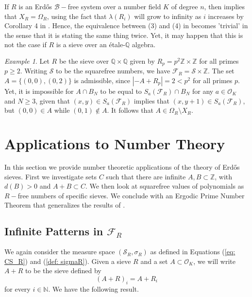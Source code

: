 \documentclass[a4paper,11pt,reqno]{amsart}
\theoremstyle{plain}
\theoremstyle{remark}
\newtheorem{example}[theorem]{Example}
\newcommand{\q}{\mathbb{Q}}
\newcommand{\z}{\mathbb{Z}}
\newcommand{\cb}{\mathcal{B}}
\newcommand{\co}{\mathcal{O}}
\newcommand{\cs}{\mathcal{S}}
\newcommand{\fr}{\mathcal{F}_R}
\begin{document}
			If $R$ is an Erdős $\cb-$free system over a number field $K$ of degree $n$, then   implies that $X_R = \Omega_R$, using the fact that $\lambda(R_i)$ will grow to infinity as $i$ increases by Corollary 4 in \cite{Fraczyk}. Hence, the equivalence between (3) and (4) in  becomes 'trivial' in the sense that it is stating the same thing twice. Yet, it may happen that this is not the case if $R$ is a sieve over an étale-$\q$ algebra.
			
			\begin{example}
				Let $R$ be the sieve over $\q\times \q$ given by $R_p = p^2\z \times \z$ for all primes $p \geq 2$. Writing $\cs$ to be the squarefree numbers, we have $\fr = \cs\times \z$. The set $A = \{(0,0),(0,2)\}$ is admissible, since $|-A+R_p| = 2 < p^2$ for all primes $p$. Yet, it is impossible for $A \cap B_N$ to be equal to $ S_a(\fr) \cap B_N$ for any $a \in \co_K$ and $N \geq 3$, given that $(x,y) \in S_a(\fr)$ implies that $(x,y+1) \in S_a(\fr)$, but $(0,0) \in A$ while $(0,1) \not \in A$. It follows that $A \in \Omega_{R} \setminus X_R$.
			\end{example}
			
			
			
			\section{Applications to Number Theory}
			
			In this section we provide number theoretic applications of the theory of Erdős sieves. First we investigate sets $C$ such that there are infinite $A,B \subset \z$, with $d(B)>0$ and $A+B \subset C$. We then look at squarefree values of polynomials as $R-$free numbers of specific sieves. We conclude with an Ergodic Prime Number Theorem that generalizes the results of \cite{Wang}.
			
			\subsection{Infinite Patterns in $\fr$}
			
			We again consider the measure space $(\cs_R, \sigma_R)$ as defined in Equations (\ref{eq: CS_R}) and (\ref{def: sigmaR}). Given a sieve $R$ and a set $A \subset \co_K$, we will write $A+R$ to be the sieve defined by $$(A+R)_i = A+R_i$$ for every $i\in \mathbb{N}$. We have the following result.
			
\end{document}
